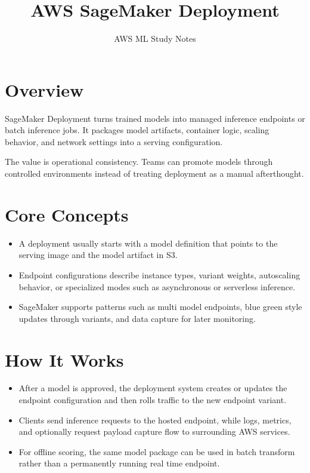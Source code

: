 \documentclass[10pt,twocolumn]{article}
\begin{document}
\title{\vspace{-1.6cm}AWS SageMaker Deployment}
\author{AWS ML Study Notes}
\date{}
\maketitle
\small

\section*{Overview}
SageMaker Deployment turns trained models into managed inference endpoints or batch inference jobs. It packages model artifacts, container logic, scaling behavior, and network settings into a serving configuration.

The value is operational consistency. Teams can promote models through controlled environments instead of treating deployment as a manual afterthought.

\section*{Core Concepts}
\begin{itemize}
\item A deployment usually starts with a model definition that points to the serving image and the model artifact in S3.
\item Endpoint configurations describe instance types, variant weights, autoscaling behavior, or specialized modes such as asynchronous or serverless inference.
\item SageMaker supports patterns such as multi model endpoints, blue green style updates through variants, and data capture for later monitoring.
\end{itemize}

\section*{How It Works}
\begin{itemize}
\item After a model is approved, the deployment system creates or updates the endpoint configuration and then rolls traffic to the new endpoint variant.
\item Clients send inference requests to the hosted endpoint, while logs, metrics, and optionally request payload capture flow to surrounding AWS services.
\item For offline scoring, the same model package can be used in batch transform rather than a permanently running real time endpoint.
\end{itemize}
\end{document}
